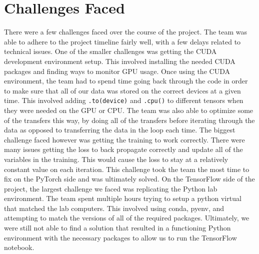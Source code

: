 \documentclass[letterpaper,twocolumn,10pt]{article}
\begin{document}
\section{Challenges Faced} \label{challenges}
There were a few challenges faced over the course of the project. The team was able to adhere to the project timeline fairly well, with a few delays related to technical issues. One of the smaller challenges was getting the CUDA development environment setup. This involved installing the needed CUDA packages and finding ways to monitor GPU usage. Once using the CUDA environment, the team had to spend time going back through the code in order to make sure that all of our data was stored on the correct devices at a given time. This involved adding \verb|.to(device)| and \verb|.cpu()| to different tensors when they were needed on the GPU or CPU. The team was also able to optimize some of the transfers this way, by doing all of the transfers before iterating through the data as opposed to transferring the data in the loop each time. The biggest challenge faced however was getting the training to work correctly. There were many issues getting the loss to back propagate correctly and update all of the variables in the training. This would cause the loss to stay at a relatively constant value on each iteration. This challenge took the team the most time to fix on the PyTorch side and was ultimately solved. On the TensorFlow side of the project, the largest challenge we faced was replicating the Python lab environment. The team spent multiple hours trying to setup a python virtual that matched the lab computers. This involved using conda, pyenv, and attempting to match the versions of all of the required packages. Ultimately, we were still not able to find a solution that resulted in a functioning Python environment with the necessary packages to allow us to run the TensorFlow notebook.
\end{document}
